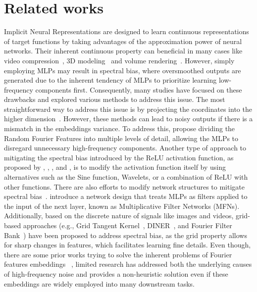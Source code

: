 \section{Related works}
Implicit Neural Representations are designed to learn continuous representations of target functions by taking advantages of the approximation power of neural networks.
%
Their inherent continuous property can beneficial in many cases like video compression~\citep{chen2021nerv,strumpler2022implicit}, 3D modeling~\citep{park2019deepsdf,atzmon2020sal,9010266,gropp2020implicit,sitzmann2019scene} and volume rendering~\citep{pumarola2021d, barron2021mip,martin2021nerf,barron2023zip}.
%
However, simply employing MLPs may result in spectral bias, where oversmoothed outputs are generated due to the inherent tendency of MLPs to prioritize learning low-frequency components first. Consequently, many studies have focused on these drawbacks and explored various methods to address this issue.
%
The most straightforward way to address this issue is by projecting the coordinates into the higher dimension~\citep{tancik2020fourier, wang2021spline}.
%
However, these methods can lead to noisy outputs if there is a mismatch in the embeddings variance.
%
To address this, \citet{landgraf2022pins} propose dividing the Random Fourier Features into multiple levels of detail, allowing the MLPs to disregard unnecessary high-frequency components. Another type of approach to mitigating the spectral bias introduced by the ReLU activation function, as proposed by \citet{sitzmann2020implicit}, \citet{ramasinghe2022beyond}, \citet{saragadam2023wire}, and \citet{shenouda2024relus}, is to modify the activation function itself by using alternatives such as the Sine function, Wavelets, or a combination of ReLU with other functions. There are also efforts to modify network structures to mitigate spectral bias~\citep{mujkanovic2024neural}. 
%
\citet{lindell2022bacon} introduce a network design that treats MLPs as filters applied to the input of the next layer, known as Multiplicative Filter Networks (MFNs). 
%
Additionally, based on the discrete nature of signals like images and videos, grid-based approaches (e.g., Grid Tangent Kernel~\citep{zhao2024grounding}, DINER~\citep{xie2023diner}, and Fourier Filter Bank~\citep{wu2023neural}) have been proposed to address spectral bias, as the grid property allows for sharp changes in features, which facilitates learning fine details.
Even though, there are some prior works trying to solve the inherent problems of Fourier features embeddings ~\citep{landgraf2022pins, yuce2022structured, hertz2021sape, saratchandran2024sampling}, limited research has addressed both the underlying causes of high-frequency noise and provides a non-heuristic solution even if these embeddings are widely employed into many downstream tasks.